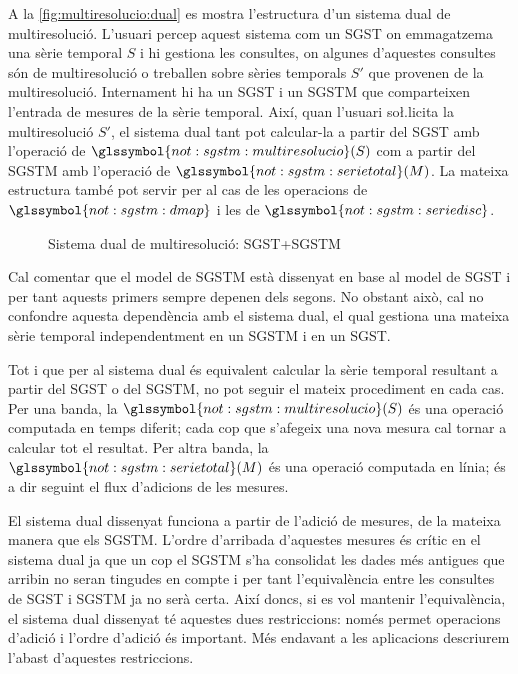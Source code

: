 A la \autoref{fig:multiresolucio:dual} es mostra l'estructura d'un
sistema dual de multiresolució. L'usuari percep aquest sistema com un
\gls{SGST} on emmagatzema una sèrie temporal $S$ i hi gestiona les
consultes, on algunes d'aquestes consultes són de multiresolució o
treballen sobre sèries temporals $S'$ que provenen de la
multiresolució.  Internament hi ha un \gls{SGST} i un \gls{SGSTM} que
comparteixen l'entrada de mesures de la sèrie temporal. Així, quan
l'usuari so\l.licita la multiresolució $S'$, el sistema dual tant pot
calcular-la a partir del \gls{SGST} amb l'operació de
$\glssymbol{not:sgstm:multiresolucio}(S)$ com a partir del \gls{SGSTM}
amb l'operació de $\glssymbol{not:sgstm:serietotal}(M)$.  La mateixa
estructura també pot servir per al cas de les operacions de
$\glssymbol{not:sgstm:dmap}$ i les de
$\glssymbol{not:sgstm:seriedisc}$.


\begin{figure}
  \centering
  
  \caption{Sistema dual de multiresolució: \gls{SGST}+\gls{SGSTM}}
  \label{fig:multiresolucio:dual}
\end{figure}


Cal comentar que el model de \gls{SGSTM} està dissenyat en base al
model de \gls{SGST} i per tant aquests primers sempre depenen dels
segons. No obstant això, cal no confondre aquesta dependència amb el
sistema dual, el qual gestiona una mateixa sèrie temporal independentment
en un \gls{SGSTM} i en un \gls{SGST}.




Tot i que per al sistema dual és equivalent calcular la sèrie temporal
resultant a partir del \gls{SGST} o del \gls{SGSTM}, no pot seguir el
mateix procediment en cada cas. Per una banda, la
$\glssymbol{not:sgstm:multiresolucio}(S)$ és una operació computada en
temps diferit; cada cop que s'afegeix una nova mesura cal tornar a
calcular tot el resultat. Per altra banda, la
$\glssymbol{not:sgstm:serietotal}(M)$ és una operació computada en
línia; és a dir seguint el flux d'adicions de les mesures.


El sistema dual dissenyat funciona a partir de l'adició de mesures, de
la mateixa manera que els \gls{SGSTM}. L'ordre d'arribada d'aquestes
mesures és crític en el sistema dual ja que un cop el \gls{SGSTM} s'ha
consolidat les dades més antigues que arribin no seran tingudes en
compte i per tant l'equivalència entre les consultes de \gls{SGST} i
\gls{SGSTM} ja no serà certa. Així doncs, si es vol mantenir
l'equivalència, el sistema dual dissenyat té aquestes dues
restriccions: només permet operacions d'adició i l'ordre d'adició és
important.  Més endavant a les aplicacions descriurem l'abast
d'aquestes restriccions.



